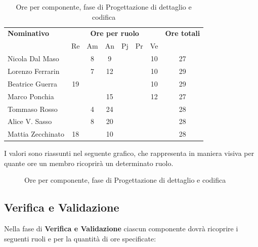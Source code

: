 \begin{table}[H]
	\centering
	\begin{tabular}{|l|c|c|c|c|c|c|c|}
		\hline
		\textbf{Nominativo} & 
		\multicolumn{6}{c|}{\textbf{Ore per ruolo}} & 
		\textbf{Ore totali} \\
		& Re & Am & An & Pj & Pr & Ve & \\
		\hline
		Nicola Dal Maso & & 8 & 9 & & & 10 & 27 \\
		Lorenzo Ferrarin & & 7 & 12 & & & 10 & 29 \\
		Beatrice Guerra & 19 & & & & & 10 & 29 \\
		Marco Ponchia & & & 15 & & & 12 & 27 \\
		Tommaso Rosso & & 4 & 24 & & & & 28 \\
		Alice V. Sasso & & 8 & 20 & & & & 28 \\
		Mattia Zecchinato & 18 & & 10 & & & & 28 \\
		\hline
	\end{tabular}
	\caption{Ore per componente, fase di Progettazione di dettaglio e codifica}
\end{table}
I valori sono riassunti nel seguente grafico, che rappresenta in maniera visiva per quante ore un membro ricoprirà un determinato ruolo.
\begin{figure}[H]
	\centering
	\caption{Ore per componente, fase di Progettazione di dettaglio e codifica}
\end{figure}

\subsection{Verifica e Validazione}
Nella fase di \textbf{Verifica e Validazione} ciascun componente dovrà ricoprire i seguenti ruoli e per la quantità di ore specificate:

